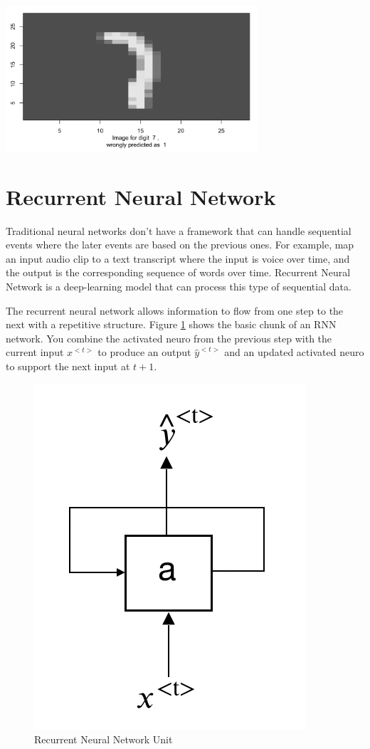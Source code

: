 \documentclass[12pt,]{krantz}
\begin{document}
\includegraphics[width=0.7\textwidth,height=\textheight]{images/misclassified_img_cnn.png}

\hypertarget{recurrent-neural-network}{%
\section{Recurrent Neural Network}\label{recurrent-neural-network}}

Traditional neural networks don't have a framework that can handle sequential events where the later events are based on the previous ones. For example, map an input audio clip to a text transcript where the input is voice over time, and the output is the corresponding sequence of words over time. Recurrent Neural Network is a deep-learning model that can process this type of sequential data.

The recurrent neural network allows information to flow from one step to the next with a repetitive structure. Figure \ref{fig:rnnunit} shows the basic chunk of an RNN network. You combine the activated neuro from the previous step with the current input \(x^{<t>}\) to produce an output \(\hat{y}^{<t>}\) and an updated activated neuro to support the next input at \(t+1\).

\begin{figure}

{\centering \includegraphics[width=0.4\linewidth]{images/rnnunit} 

}

\caption{Recurrent Neural Network Unit}\label{fig:rnnunit}
\end{figure}
\end{document}

